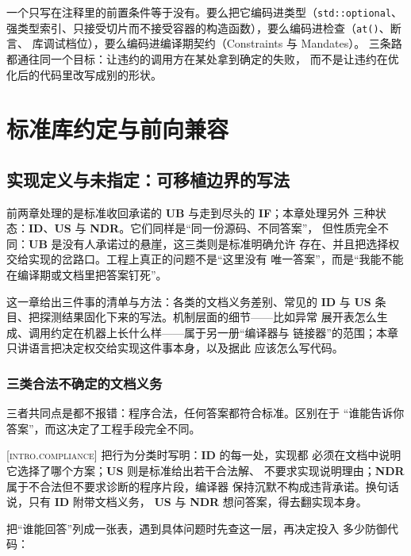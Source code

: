 \documentclass[12pt,a4paper,fontset=fandol]{ctexbook}
\newcommand{\Fn}[1]{\texttt{#1()}}
\newcommand{\Tp}[1]{\texttt{#1}}
\newcommand{\UB}{\textbf{\textsf{UB}}}
\newcommand{\IDB}{\textbf{\textsf{ID}}}
\newcommand{\USB}{\textbf{\textsf{US}}}
\newcommand{\NDR}{\textbf{\textsf{NDR}}}
\newcommand{\ILLF}{\textbf{\textsf{IF}}}
\newcommand{\Std}[1]{\textsc{[#1]}}
\begin{document}
\begin{guideline}[title={前置条件是接口的一部分}]
一个只写在注释里的前置条件等于没有。要么把它编码进类型（\Tp{std::optional}、
强类型索引、只接受切片而不接受容器的构造函数），要么编码进检查（\Fn{at}、断言、
库调试档位），要么编码进编译期契约（Constraints 与 Mandates）。
三条路都通往同一个目标：让违约的调用方在某处拿到确定的失败，
而不是让违约在优化后的代码里改写成别的形状。
\end{guideline}

\part{标准库约定与前向兼容}
\chapter{实现定义与未指定：可移植边界的写法}\label{ch:ub13-implementation}

前两章处理的是标准收回承诺的 \UB{} 与走到尽头的 \ILLF{}；本章处理另外
三种状态：\IDB{}、\USB{} 与 \NDR{}。它们同样是“同一份源码、不同答案”，
但性质完全不同：\UB{} 是没有人承诺过的悬崖，这三类则是标准明确允许
存在、并且把选择权交给实现的岔路口。工程上真正的问题不是“这里没有
唯一答案”，而是“我能不能在编译期或文档里把答案钉死”。

这一章给出三件事的清单与方法：各类的文档义务差别、常见的 \IDB{} 与
\USB{} 条目、把探测结果固化下来的写法。机制层面的细节——比如异常
展开表怎么生成、调用约定在机器上长什么样——属于另一册“编译器与
链接器”的范围；本章只讲语言把决定权交给实现这件事本身，以及据此
应该怎么写代码。

\section{三类合法不确定的文档义务}\label{sec:ub13-obligation}

三者共同点是都不报错：程序合法，任何答案都符合标准。区别在于
“谁能告诉你答案”，而这决定了工程手段完全不同。

\begin{clause}[title=标准怎么说：符合性条款里的三种承诺]
\Std{intro.compliance} 把行为分类时写明：\IDB{} 的每一处，实现都
必须在文档中说明它选择了哪个方案；\USB{} 则是标准给出若干合法解、
不要求实现说明理由；\NDR{} 属于不合法但不要求诊断的程序片段，编译器
保持沉默不构成违背承诺。换句话说，只有 \IDB{} 附带文档义务，
\USB{} 与 \NDR{} 想问答案，得去翻实现本身。
\end{clause}

把“谁能回答”列成一张表，遇到具体问题时先查这一层，再决定投入
多少防御代码：
\end{document}
